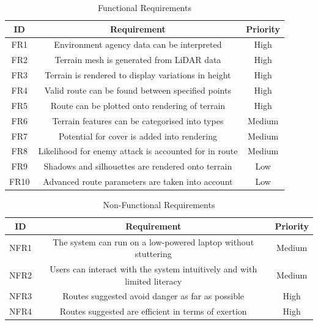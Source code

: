 \documentclass[12pt,a4paper]{article}
\begin{document}
  \begin{table}[H]
    \caption{Functional Requirements}
    \label{fr_table}
    \centering
    \begin{tabular}{|c|c|c|}
      \hline
      \textbf{ID} & \textbf{Requirement} & \textbf{Priority} \\ \hline
      FR1 & Environment agency data can be interpreted & High \\ \hline
      FR2 & Terrain mesh is generated from LiDAR data & High \\ \hline
      FR3 & Terrain is rendered to display variations in height & High \\ \hline
      FR4 & Valid route can be found between specified points & High \\ \hline
      FR5 & Route can be plotted onto rendering of terrain & High \\ \hline
      FR6 & Terrain features can be categorised into types & Medium \\ \hline
      FR7 & Potential for cover is added into rendering & Medium \\ \hline
      FR8 & Likelihood for enemy attack is accounted for in route & Medium \\ \hline
      FR9 & Shadows and silhouettes are rendered onto terrain & Low \\ \hline
      FR10 & Advanced route parameters are taken into account & Low \\ \hline
    \end{tabular}
  \end{table}

  \begin{table}[H]
    \caption{Non-Functional Requirements}
    \label{nfr_table}
    \centering
    \begin{tabular}{|c|c|c|}
      \hline
      \textbf{ID} & \textbf{Requirement} & \textbf{Priority} \\ \hline
      NFR1 & The system can run on a low-powered laptop without stuttering & Medium \\ \hline
      NFR2 & Users can interact with the system intuitively and with limited literacy & Medium \\ \hline
      NFR3 & Routes suggested avoid danger as far as possible & High \\ \hline
      NFR4 & Routes suggested are efficient in terms of exertion & High \\ \hline
    \end{tabular}

  \end{table}
\end{document}
